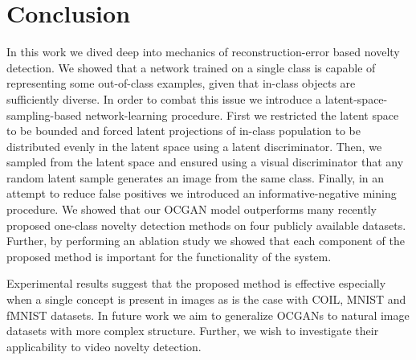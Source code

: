 \documentclass[10pt,twocolumn,letterpaper]{article}
\begin{document}
\section{Conclusion}
In this work we dived deep into mechanics of reconstruction-error based novelty detection. We showed that a network trained on a single class is capable of representing some out-of-class examples, given that in-class objects are sufficiently diverse. In order to combat this issue we introduce a latent-space-sampling-based network-learning procedure. First we restricted the latent space to be bounded and forced latent projections of in-class population to be distributed evenly in the latent space using a latent discriminator. Then, we sampled from the latent space and ensured using a visual discriminator that any random latent sample generates an image from the same class. Finally, in an attempt to reduce false positives we introduced an informative-negative mining procedure. We showed that our OCGAN model outperforms many recently proposed one-class novelty detection methods on four publicly available datasets. Further, by performing an ablation study we showed that each component of the proposed method is important for the functionality of the system. 

Experimental results suggest that the proposed method is effective especially when a single concept is present in images as is the case with COIL, MNIST and fMNIST datasets. In future work  we aim to generalize OCGANs to natural image datasets with more complex structure. Further, we wish to investigate their applicability to video novelty detection. 


{\small


	}\underline{}
\end{document}
